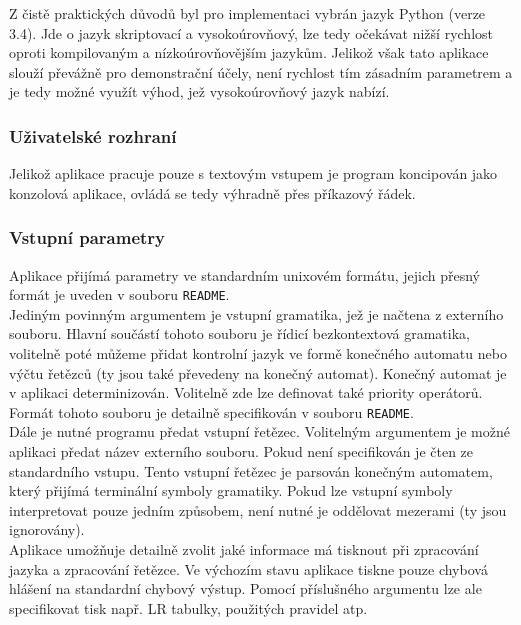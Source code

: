 Z čistě praktických důvodů byl pro implementaci vybrán jazyk Python
(verze 3.4). Jde o jazyk skriptovací a vysokoúrovňový, lze tedy
očekávat nižší rychlost oproti kompilovaným a nízkoúrovňovějším jazykům.
Jelikož však tato aplikace slouží převážně pro demonstrační účely,
není rychlost tím zásadním parametrem a je tedy možné využít
výhod, jež vysokoúrovňový jazyk nabízí.

\subsubsection*{Uživatelské rozhraní}

Jelikož aplikace pracuje pouze s textovým vstupem je program koncipován
jako konzolová aplikace, ovládá se tedy výhradně přes příkazový řádek.

\subsubsection*{Vstupní parametry}

Aplikace přijímá parametry ve standardním unixovém formátu, jejich přesný
formát je uveden v souboru \texttt{README}.\\

Jediným povinným argumentem je vstupní gramatika, jež je načtena z
externího souboru. Hlavní součástí tohoto souboru je řídicí bezkontextová gramatika,
volitelně poté můžeme přidat kontrolní jazyk ve formě konečného automatu nebo
výčtu řetězců (ty jsou také převedeny na konečný automat). Konečný
automat je v aplikaci determinizován.
Volitelně zde lze definovat také priority operátorů.
Formát tohoto souboru je detailně specifikován v souboru \texttt{README}.\\

Dále je nutné programu předat vstupní řetězec. Volitelným argumentem je
možné aplikaci předat název externího souboru. Pokud není specifikován
je čten ze standardního vstupu. Tento vstupní řetězec je parsován konečným
automatem, který přijímá terminální symboly gramatiky.
Pokud lze vstupní symboly interpretovat pouze jedním způsobem, není nutné
je oddělovat mezerami (ty jsou ignorovány).\\

Aplikace umožňuje detailně zvolit jaké informace má tisknout
při zpracování jazyka a zpracování řetězce. Ve výchozím stavu
aplikace tiskne pouze chybová hlášení na standardní chybový výstup.
Pomocí příslušného argumentu lze ale specifikovat tisk např. LR tabulky,
použitých pravidel atp.\\

